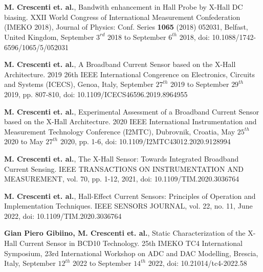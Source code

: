 \documentclass[12pt, a4paper]{article}
\begin{document}
\section*{%
}	%
\begin{thebibliography}{}
	
	
	
	\textbf{M. Crescenti et. al.}, Bandwith enhancement in Hall Probe by X-Hall DC biasing. XXII World Congress of International Measurement Confederation (IMEKO 2018), Journal of Physics: Conf. Series \textbf{1065} (2018) 052031, Belfast, United Kingdom, September $3^{rd}$ 2018 to September $6^{th}$ 2018, doi: 10.1088/1742-6596/1065/5/052031
	
	\textbf{M. Crescenti et. al.}, A  Broadband Current Sensor based on the X-Hall Architecture. 2019 26th IEEE International Congerence on Electronics, Circuits and Systems (ICECS), Genoa, Italy, September $27^{th}$ 2019 to September $29^{th}$ 2019, pp. 807-810, doi: 10.1109/ICECS46596.2019.8964955
	
	\textbf{M. Crescenti et. al.}, Experimental Assessment of a Broadband Current Sensor based on the X-Hall Architecture. 2020 IEEE International Instrumentation and Measurement Technology Conference (I2MTC), Dubrovnik, Croatia, May $25^{th}$ 2020 to May $27^{th}$ 2020, pp. 1-6, doi: 10.1109/I2MTC43012.2020.9128994
	
	\textbf{M. Crescenti et. al.}, The X-Hall Sensor: Towards Integrated Broadband Current Sensing. IEEE TRANSACTIONS ON INSTRUMENTATION AND MEASUREMENT, vol. 70, pp. 1-12, 2021, doi: 10.1109/TIM.2020.3036764
	
	\textbf{M. Crescenti et. al.}, Hall-Effect Current Sensors: Principles of Operation and Implementation Techniques. IEEE SENSORS JOURNAL, vol. 22, no. 11, June 2022, doi: 10.1109/TIM.2020.3036764		
	
	\textbf{Gian Piero Gibiino, M. Crescenti et. al.}, Static Characterization of the X-Hall Current
	Sensor in BCD10 Technology. 25th IMEKO TC4 International Symposium, 23rd International Workshop on ADC and DAC Modelling, Brescia, Italy, September $12^{th}$ 2022 to September $14^{th}$ 2022, doi: 10.21014/tc4-2022.58
	

\end{thebibliography}
\end{document}
